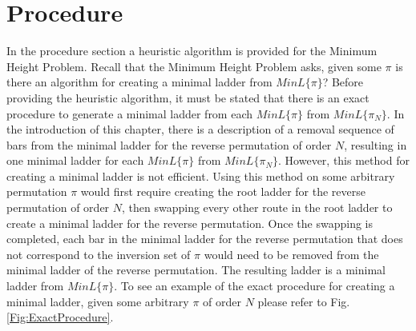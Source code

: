 \section{Procedure}

In the procedure section a heuristic algorithm is provided for the Minimum Height Problem. Recall that the 
Minimum Height Problem asks, given some $\pi$ is there an algorithm for creating a minimal ladder 
from $MinL\{\pi\}$? Before providing the heuristic algorithm, it must be stated that there is an exact  
procedure to generate a minimal ladder from each $MinL\{\pi\}$ from $MinL\{\pi_{N}\}$. In the introduction of this chapter, there 
is a description of a removal sequence of bars from the minimal ladder for the reverse permutation of order $N$, resulting in one  
minimal ladder for each $MinL\{\pi\}$ from $MinL\{\pi_{N}\}$. However, this method for creating a minimal ladder is not efficient. 
Using this method on some arbitrary permutation $\pi$ would first require creating the root ladder for the reverse 
permutation of order $N$, then swapping every other route in the root ladder to create a minimal ladder
for the reverse permutation. Once the swapping is completed, each bar in the minimal ladder for the reverse permutation that 
does not correspond to the inversion set of $\pi$ would need to be removed from the minimal ladder of the reverse permutation. 
The resulting ladder is a minimal ladder from $MinL\{\pi\}$. To see an example of the exact procedure 
for creating a minimal ladder, given some arbitrary $\pi$ of order $N$ please refer to Fig. \ref{Fig:ExactProcedure}.

